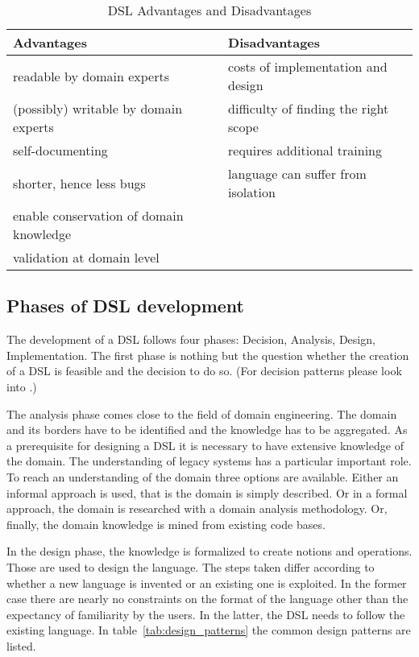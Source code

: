 \documentclass{scrartcl}
\newcommand{\tick}{\Checkmark}
\newcommand{\fail}{\XSolidBrush}
\begin{document}
\begin{table}[!ht]
    \center
    \begin{tabular}{ll}
\textbf{Advantages} & \textbf{Disadvantages}\\\hline
\tick readable by domain experts & \fail costs of implementation and design\\
\tick (possibly) writable by domain experts & \fail difficulty of finding the
right scope\\
\tick self-documenting & \fail requires additional training\\
\tick shorter, hence less bugs & \fail language can suffer from isolation\\
\tick enable conservation of domain knowledge & \\
\tick validation at domain level & \\
    \end{tabular}
    \caption{DSL Advantages and Disadvantages}
    \label{tab:dsl_advantage}
\end{table}

\subsection{Phases of DSL development}
\label{sub:phases_of_dsl_development}
The development of a DSL follows four phases: Decision, Analysis, Design,
Implementation. The first phase is nothing but the question whether the
creation of a DSL is feasible and the decision to do so. (For decision patterns
please look into \cite{mernik2005and}.)

The analysis phase comes close to the field of domain engineering. The domain
and its borders have to be identified and the knowledge has to be aggregated.
As a prerequisite for designing a DSL it is necessary to have extensive
knowledge of the domain. The understanding of legacy systems has a particular
important role. To reach an understanding of the domain three
options are available. Either an informal approach is used, that is the domain is simply described. Or in a formal approach, the domain is
researched with a domain analysis methodology. Or, finally, the domain
knowledge is mined from existing code bases.

In the design phase, the knowledge is formalized to create notions and
operations. Those are used to design the language. The steps taken differ
according to whether a new language is invented or an existing one is
exploited. In the former case there are nearly no constraints on the format of
the language other than the expectancy of familiarity by the users. In the
latter, the DSL needs to follow the existing language. In
table~\ref{tab:design_patterns} the common design patterns are listed.
\end{document}
